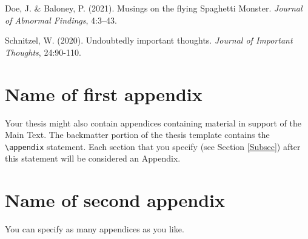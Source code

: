 \documentclass{amsart}
\theoremstyle{plain}
\begin{document}
\newpage
\begin{thebibliography}{10}
 Doe, J. \& Baloney, P. (2021).
Musings on the flying Spaghetti Monster.
\emph{Journal of Abnormal Findings}, 4:3--43.

 Schnitzel, W. (2020).
Undoubtedly important thoughts.
\emph{Journal of Important Thoughts}, 24:90-110.
\end{thebibliography}




\newpage
\appendix
\section{Name of first appendix}
Your thesis might also contain appendices containing material in support of the Main Text.
The backmatter portion of the thesis template contains the \verb|\appendix| statement.
Each section that you specify (see Section \ref{Subsec}) after this statement will be considered an Appendix.


\section{Name of second appendix}
You can specify as many appendices as you like.
\end{document}
